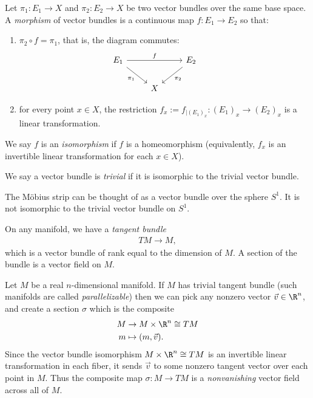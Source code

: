 \documentclass[11pt]{book}
\begin{document}
\begin{definition}\label{def:isomorphism-of-vb} Let $\pi_1 \colon E_1 \to X$ and $\pi_2 \colon E_2 \to X$ be two vector bundles over the same base space. A \emph{morphism} of vector bundles is a continuous map $f \colon E_1\to E_2$ so that:
\begin{enumerate}
    \item $\pi_2\circ f = \pi_1$, that is, the diagram commutes:
\[ \begin{tikzcd}
    E_1\ar[rr,"f" above]\ar[dr,"\pi_1" below left] & & E_2\ar[dl,"\pi_2" below right] & \\
     & X
\end{tikzcd}\]
    \item for every point $x\in X$, the restriction $f_x := f_{|(E_1)_x} \colon (E_1)_x \to (E_2)_x$ is a linear transformation.
\end{enumerate}
We say $f$ is an \emph{isomorphism} if $f$ is a homeomorphism (equivalently, $f_x$ is an invertible linear transformation for each $x\in X$).
\end{definition}

\begin{terminology} We say a vector bundle is \emph{trivial} if it is isomorphic to the trivial vector bundle.
\end{terminology}

\begin{example} The M\"{o}bius strip can be thought of as a vector bundle over the sphere $S^1$. It is not isomorphic to the trivial vector bundle on $S^1$.
\end{example}

\begin{example} On any manifold, we have a \emph{tangent bundle}
\begin{align*}
    TM \to M,
\end{align*}
which is a vector bundle of rank equal to the dimension of $M$. A section of the bundle is a vector field on $M$.
\end{example}

\begin{example} Let $M$ be a real $n$-dimensional manifold. If $M$ has trivial tangent bundle (such manifolds are called \emph{parallelizable}) then we can pick any nonzero vector $\vec{v}\in \R^n$, and create a section $\sigma$ which is the composite
\begin{align*}
    M &\to M \times \R^n \cong TM \\
    m &\mapsto (m,\vec{v}).
\end{align*}
Since the vector bundle isomorphism $M \times \R^n \cong TM$ is an invertible linear transformation in each fiber, it sends $\vec{v}$ to some nonzero tangent vector over each point in $M$. Thus the composite map $\sigma \colon M \to TM$ is a \emph{nonvanishing} vector field across all of $M$.
\end{example}
\end{document}
